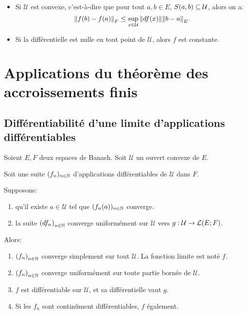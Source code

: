 \begin{remarque}
	\begin{itemize}
		\item Si $\mathcal{U}$ est convexe, c'est-à-dire que pour tout $a, b \in
			E$, $S(a, b) \subseteq \mathcal{U}$, alors on a:
			\begin{equation*}
				\norm{f(b) - f(a)}_{F} \leq \displaystyle \sup_{x \in \mathcal{U}}
				\norm{df(x)} \norm{b - a}_{E}.
			\end{equation*}
		\item Si la différentielle est nulle en tout point de $\mathcal{U}$,
			alors $f$ est constante.
	\end{itemize}
\end{remarque}

\section{Applications du théorème des accroissements finis}

\subsection{Différentiabilité d'une limite d'applications différentiables}

\begin{corollary}
	Soient $E, F$ deux espaces de Banach.
	Soit $\mathcal{U}$ un ouvert convexe de $E$.

	Soit une suite $(f_{n})_{n \in \mathbb{N}}$ d'applications différentiables
	de $\mathcal{U}$ dans $F$.

	Supposons:
	\begin{enumerate}
		\item qu'il existe $a \in \mathcal{U}$ tel que $(f_{n}(a))_{n \in
			\mathbb{N}}$ converge.
		\item la suite ${(df_{n})}_{n \in \mathbb{N}}$ converge uniformément sur
			$\mathcal{U}$ vers
			$g : \mathcal{U} \rightarrow \mathcal{L}(E; F)$.
	\end{enumerate}

	Alors:

	\begin{enumerate}
		\item ${(f_{n})}_{n \in \mathbb{N}}$ converge simplement sur tout
			$\mathcal{U}$. La fonction limite est noté $f$.
		\item ${(f_{n})}_{n \in \mathbb{N}}$ converge uniformément sur toute
			partie bornée de $\mathcal{U}$.
		\item $f$ est différentiable sur $\mathcal{U}$, et sa différentielle
			vaut $g$.
		\item Si les $f_{n}$ sont continûment différentiables, $f$ également.
	\end{enumerate}
\end{corollary}

